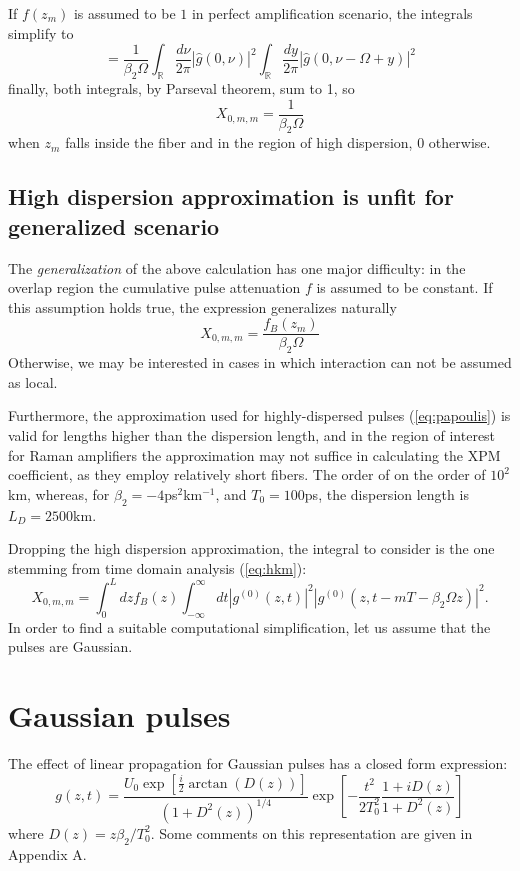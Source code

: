 \documentclass[10pt, lettersize, journal, onecolumn]{IEEEtran}
\begin{document}
If $f(z_m)$ is assumed to be $1$ in perfect amplification scenario, the integrals simplify to
\begin{equation}
	=\frac{1}{ \beta_2 \Omega}\int_{\mathbb{R}} \frac{d\nu}{2\pi}  |\hat{g}(0, \nu)|^2 \int_{\mathbb{R}}  \frac{dy}{2\pi} \left|\hat{g}\left(0, \nu-\Omega + y\right)\right|^2
\end{equation}
finally, both integrals, by Parseval theorem, sum to 1, so 
\begin{equation}
	X_{0, m, m} = \frac{1}{\beta_2 \Omega}  
\end{equation}
when $z_m$ falls inside the fiber and in the region of high dispersion, $0$ otherwise.

	\subsection{High dispersion approximation is unfit for generalized scenario}
The \textit{generalization} of the above calculation has one major difficulty: in the overlap region the cumulative pulse attenuation $f$ is assumed to be constant.
If this assumption holds true, the expression generalizes naturally
\begin{equation}
	X_{0, m, m} = \frac{f_B(z_m)}{\beta_2 \Omega}	
\end{equation}
Otherwise, we may be interested in cases in which interaction can not be assumed as local. 

Furthermore, the approximation used for highly-dispersed pulses (\ref{eq:papoulis}) is valid for lengths higher than the dispersion length, and in the region of interest for Raman amplifiers the approximation may not suffice in calculating the XPM coefficient, as they employ relatively short fibers. The order of on the order of $10^2$km, whereas, for $\beta_2 = -4$ps$^2$km$^{-1}$, and $T_0 = 100$ps, the dispersion length is $L_D = 2500$km.

Dropping the high dispersion approximation, the integral to consider is the one stemming from time domain analysis (\ref{eq:hkm}):
\begin{equation}\label{eq:0mm}
	X_{0, m, m} = \int_{0}^{L} dz f_B(z) \int_{-\infty}^{\infty} dt |g^{(0)}(z, t)|^2 |g^{(0)}(z, t-mT-\beta_2 \Omega z)|^2.
\end{equation}
In order to find a suitable computational simplification, let us assume that the pulses are Gaussian.
\section{Gaussian pulses} \label{gauss}
The effect of linear propagation for Gaussian pulses has a closed form expression:
\begin{equation}\label{eq:field}
	g(z, t) = \frac{U_0 \exp[\frac{i}{2} \arctan(D(z))]}{(1+D^2(z))^{1/4}} \exp\left[-\frac{t^2}{2T_0^2} \frac{1+iD(z)}{1+D^2(z)}\right]
\end{equation}
where $D(z) = z\beta_2 / T_0^2$. Some comments on this representation are given in Appendix A.
\end{document}
